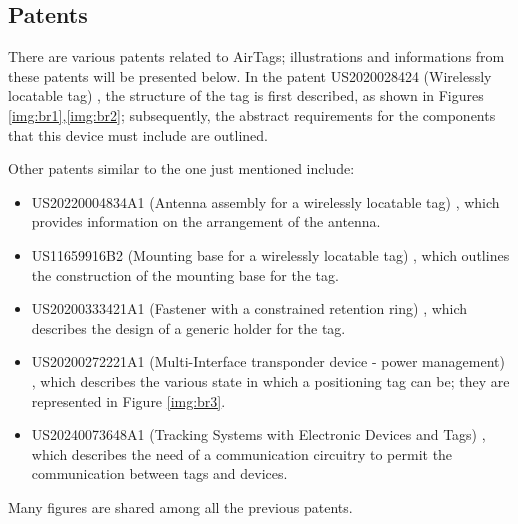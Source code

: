 \documentclass[english]{article}
\begin{document}
\subsection{Patents} 
There are various patents related to AirTags; illustrations and informations from these patents will be presented below. In the patent US2020028424 (Wirelessly locatable tag) \cite{Perkins_Sano_Walton_Wang_Werner_Ashcroft_De_Hunter_Kim_Crosby_Jung_Schaevitz_Avendal_Da_Di_Nath_Papantonis_Graham_Thompson_Copeland_Ely_2022}, the structure of the tag is first described, as shown in Figures \ref{img:br1},\ref{img:br2}; subsequently, the abstract requirements for the components that this device must include are outlined. 

Other patents similar to the one just mentioned include:
\begin{itemize}
\item US20220004834A1 (Antenna assembly for a wirelessly locatable tag) \cite{Perkins_Avendal_Da_Di_Nath_Papantonis_Schaevitz_Werner_2022}, which provides information on the arrangement of the antenna.
\item US11659916B2 (Mounting base for a wirelessly locatable tag) \cite{Perkins_Thompson_2023}, which outlines the construction of the mounting base for the tag.
\item US20200333421A1 (Fastener with a constrained retention ring) \cite{Perkins_De_Hunter_2020}, which describes the design of a generic holder for the tag.
\item US20200272221A1 (Multi-Interface transponder device - power management) \cite{Foster_Nilsen_Puskarich_2020}, which describes the various state in which a positioning tag can be; they are represented in Figure \ref{img:br3}.
\item US20240073648A1 (Tracking Systems with Electronic Devices and Tags) \cite{Puskarich_2024}, which describes the need of a communication circuitry to permit the communication between tags and devices.
\end{itemize}
Many figures are shared among all the previous patents.
\end{document}
